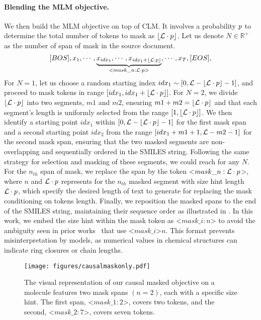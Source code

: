 \paragraph{Blending the MLM objective.} We then
build the MLM objective on top of CLM. It involves a probability ${p}$ to determine the total number of tokens to mask as $\lfloor{\mathcal{L}\cdot {p}}\rfloor$. Let us denote $N\in \mathbb{R}^{+}$ as the number of span of mask in the source document. 
\begin{equation}
{[BOS],x_1,\cdots,
\underbrace{x_{idx_1},\cdots, x_{idx_1+\lfloor \mathcal{L}\cdot {p}\rfloor}}_{<mask\_n:\mathcal{L}\cdot{p}>},\cdots,
x_{\ensuremath{T}},[EOS]},
\end{equation}
For $N=1$, let us choose a random starting index $idx_1 \sim \left[0, \mathcal{L} - \lfloor{\mathcal{L}\cdot {p}}\rfloor - 1\right]$, and proceed to mask tokens in range $\left[idx_1,idx_1 + \lfloor{\mathcal{L}\cdot {p}}\rfloor\right]$. 
For $N=2$, we divide $\lfloor{\mathcal{L}\cdot {p}}\rfloor$ into two segments, $m1$ and  $m2$, ensuring $m1 + m2 = \lfloor{\mathcal{L}\cdot {p}}\rfloor$ and that each segment's length is uniformly selected from the range $[1,\lfloor{\mathcal{L}\cdot {p}}\rfloor]$.
We then identify a starting point $idx_1$ within $\left[0, \mathcal{L}  - \lfloor{\mathcal{L}\cdot {p}}\rfloor - 1\right]$ for the first mask span and a second starting point $idx_2$ from the range $\left[idx_1 + m1 + 1, \mathcal{L} - m2 - 1\right]$ for the second mask span, ensuring that the two masked segments are non-overlapping and sequentially ordered in the SMILES string. Following the same strategy for selection and masking of these segments, we could reach for any $N$. For the $n_{th}$ span of mask, we replace the span by the token <$mask\_n: \mathcal{L}\cdot{p}$>, where $n$ and $\mathcal{L}\cdot{p}$ represents for the $n_{th}$ masked segment with size hint length $\mathcal{L}\cdot{p}$, which specify the desired length of text to generate for replacing the mask conditioning on tokens length.
Finally, we  reposition the masked spans to the end of the SMILES string, maintaining their sequence order as illustrated in . 
In this work, we embed the size hint within the mask token as <$mask\_i:n$> to avoid the ambiguity seen in prior works~\citeauthor{aghajanyan2021size_hint}  that use <$mask\_i$>$n$. This format prevents misinterpretation by models, as numerical values in chemical structures can indicate ring closures or chain lengths.

\begin{figure}[!ht]
    \centering
    \texttt{[image: figures/causalmaskonly.pdf]}
    \caption[A visual representation of causal masked objective on molecule incorporated with size hints]
    {The visual representation of our causal masked objective on a molecule features two mask spans $(n=2)$, each with a specific size hint. The first span, <$mask\_1:2$>, covers two tokens, and the second, <$mask\_2:7$>, covers seven tokens.}
    \label{fig:cm_mol_example_with_sizeHint}
\end{figure}






